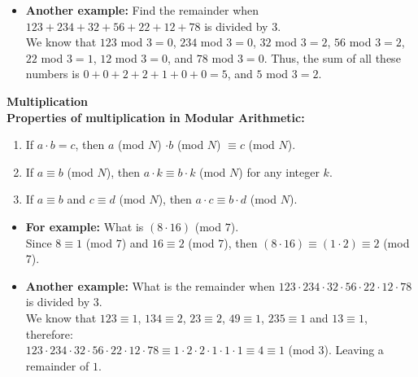 \begin{justify}
\begin{itemize}
\item \textbf{Another example:} Find the remainder when $123 + 234 + 32 + 56 + 22 + 12 + 78$ is divided by $3$.\\
We know that $123$ mod $3 = 0$, $234$ mod $3 = 0$, $32$ mod $3 = 2$, $56$ mod $3 = 2$, $22$ mod $3 = 1$, $12$ mod $3 = 0$, and $78$ mod $3 = 0$. 
Thus, the sum of all these numbers is $0 + 0 + 2 + 2 + 1 + 0 + 0 = 5$, and $5$ mod $3 = 2$.
\end{itemize}
\textbf{Multiplication}\\
\textbf{Properties of multiplication in Modular Arithmetic:}
\begin{enumerate}
\item If $a \cdot b = c$, then $a$ (mod $N$) $\cdot b$ (mod $N$) $\equiv c$ (mod $N$).
\item If $a \equiv b$ (mod $N$), then $a \cdot k \equiv b \cdot k$ (mod $N$) for any integer $k$.
\item If $a \equiv b$ and $c \equiv d$ (mod $N$), then $a \cdot c \equiv b \cdot d$ (mod $N$).
\end{enumerate}
\begin{itemize}
\item \textbf{For example:} What is $(8 \cdot 16)$ (mod $7$).\\
Since $8 \equiv 1$ (mod $7$) and $16 \equiv 2$ (mod $7$), then $(8 \cdot 16) \equiv (1 \cdot 2) \equiv 2$ (mod $7$).
\item \textbf{Another example:} What is the remainder when $123 \cdot 234 \cdot 32 \cdot 56 \cdot 22 \cdot 12 \cdot 78$ is divided by $3$.\\
We know that $123 \equiv 1$, $134 \equiv 2$, $23 \equiv 2$, $49 \equiv 1$, $235 \equiv 1$ and $13 \equiv 1$, therefore:\\
$123 \cdot 234 \cdot 32 \cdot 56 \cdot 22 \cdot 12 \cdot 78 \equiv 1 \cdot 2 \cdot 2 \cdot 1 \cdot 1 \cdot 1 \equiv 4 \equiv 1$ (mod $3$).
Leaving a remainder of $1$.
\end{itemize}
\end{justify}
